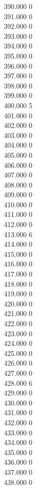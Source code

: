 { 390.000	0 \\
 391.000	0 \\
 392.000	0 \\
 393.000	0 \\
 394.000	0 \\
 395.000	0 \\
 396.000	0 \\
 397.000	0 \\
 398.000	0 \\
 399.000	0 \\
 400.000	5 \\
 401.000	0 \\
 402.000	0 \\
 403.000	0 \\
 404.000	0 \\
 405.000	0 \\
 406.000	0 \\
 407.000	0 \\
 408.000	0 \\
 409.000	0 \\
 410.000	0 \\
 411.000	0 \\
 412.000	0 \\
 413.000	6 \\
 414.000	0 \\
 415.000	0 \\
 416.000	0 \\
 417.000	0 \\
 418.000	0 \\
 419.000	0 \\
 420.000	0 \\
 421.000	0 \\
 422.000	0 \\
 423.000	0 \\
 424.000	0 \\
 425.000	0 \\
 426.000	0 \\
 427.000	0 \\
 428.000	6 \\
 429.000	0 \\
 430.000	0 \\
 431.000	0 \\
 432.000	0 \\
 433.000	0 \\
 434.000	0 \\
 435.000	0 \\
 436.000	0 \\
 437.000	0 \\
 438.000	0 \\
}

